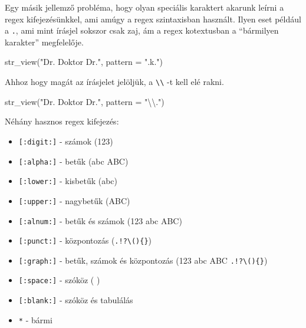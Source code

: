 \documentclass[
]{book}
\newenvironment{Shaded}{\begin{snugshade}}{\end{snugshade}}
\newcommand{\AttributeTok}[1]{\textcolor[rgb]{0.77,0.63,0.00}{#1}}
\newcommand{\FunctionTok}[1]{\textcolor[rgb]{0.00,0.00,0.00}{#1}}
\newcommand{\NormalTok}[1]{#1}
\newcommand{\SpecialCharTok}[1]{\textcolor[rgb]{0.00,0.00,0.00}{#1}}
\newcommand{\StringTok}[1]{\textcolor[rgb]{0.31,0.60,0.02}{#1}}
\providecommand{\tightlist}{%
  \setlength{\itemsep}{0pt}\setlength{\parskip}{0pt}}
\begin{document}
\hypertarget{htmlwidget-64a2acfb1ed1c74b7f86}{}

\begin{Shaded}
\end{Shaded}

\hypertarget{htmlwidget-f7392aa773cbacf6aa2b}{}

Egy másik jellemző probléma, hogy olyan speciális karaktert akarunk
leírni a regex kifejezésünkkel, ami amúgy a regex szintaxisban használt.
Ilyen eset például a \texttt{.}, ami mint írásjel sokszor csak zaj, ám a
regex kotextusban a ``bármilyen karakter'' megfelelője.

\begin{Shaded}
\begin{Highlighting}[]
\FunctionTok{str\_view}\NormalTok{(}\StringTok{"Dr. Doktor Dr."}\NormalTok{, }\AttributeTok{pattern =} \StringTok{".k."}\NormalTok{)}
\end{Highlighting}
\end{Shaded}

\hypertarget{htmlwidget-1572e12d88028651ab15}{}

Ahhoz hogy magát az írásjelet jelöljük, a
\texttt{\textbackslash{}\textbackslash{}} -t kell elé rakni.

\begin{Shaded}
\begin{Highlighting}[]
\FunctionTok{str\_view}\NormalTok{(}\StringTok{"Dr. Doktor Dr."}\NormalTok{, }\AttributeTok{pattern =} \StringTok{"}\SpecialCharTok{\textbackslash{}\textbackslash{}}\StringTok{."}\NormalTok{)}
\end{Highlighting}
\end{Shaded}

\hypertarget{htmlwidget-2dc0439d93dc3575f738}{}

Néhány hasznos regex kifejezés:

\begin{itemize}
\tightlist
\item
  \texttt{{[}:digit:{]}} - számok (123)
\item
  \texttt{{[}:alpha:{]}} - betűk (abc ABC)
\item
  \texttt{{[}:lower:{]}} - kisbetűk (abc)
\item
  \texttt{{[}:upper:{]}} - nagybetűk (ABC)
\item
  \texttt{{[}:alnum:{]}} - betűk és számok (123 abc ABC)
\item
  \texttt{{[}:punct:{]}} - központozás
  (\texttt{.!?\textbackslash{}()\{\}})
\item
  \texttt{{[}:graph:{]}} - betűk, számok és központozás (123 abc ABC
  \texttt{.!?\textbackslash{}()\{\}})
\item
  \texttt{{[}:space:{]}} - szóköz ( )
\item
  \texttt{{[}:blank:{]}} - szóköz és tabulálás
\item
  \texttt{*} - bármi
\end{itemize}
\end{document}
